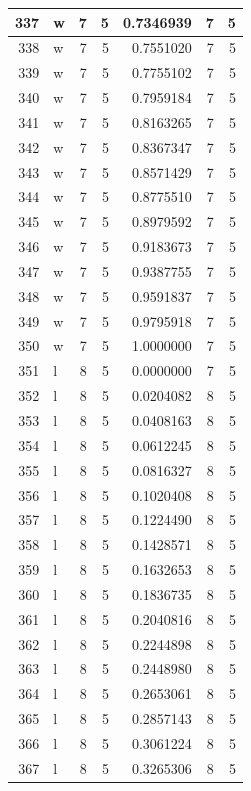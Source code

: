 \documentclass[
  letterpaper,
  DIV=11,
  numbers=noendperiod]{scrreprt}
\begin{document}
\begin{table}
\begin{tabular}[t]{r|l|r|r|r|r|r}
\hline
337 & w & 7 & 5 & 0.7346939 & 7 & 5\\
\hline
338 & w & 7 & 5 & 0.7551020 & 7 & 5\\
\hline
339 & w & 7 & 5 & 0.7755102 & 7 & 5\\
\hline
340 & w & 7 & 5 & 0.7959184 & 7 & 5\\
\hline
341 & w & 7 & 5 & 0.8163265 & 7 & 5\\
\hline
342 & w & 7 & 5 & 0.8367347 & 7 & 5\\
\hline
343 & w & 7 & 5 & 0.8571429 & 7 & 5\\
\hline
344 & w & 7 & 5 & 0.8775510 & 7 & 5\\
\hline
345 & w & 7 & 5 & 0.8979592 & 7 & 5\\
\hline
346 & w & 7 & 5 & 0.9183673 & 7 & 5\\
\hline
347 & w & 7 & 5 & 0.9387755 & 7 & 5\\
\hline
348 & w & 7 & 5 & 0.9591837 & 7 & 5\\
\hline
349 & w & 7 & 5 & 0.9795918 & 7 & 5\\
\hline
350 & w & 7 & 5 & 1.0000000 & 7 & 5\\
\hline
351 & l & 8 & 5 & 0.0000000 & 7 & 5\\
\hline
352 & l & 8 & 5 & 0.0204082 & 8 & 5\\
\hline
353 & l & 8 & 5 & 0.0408163 & 8 & 5\\
\hline
354 & l & 8 & 5 & 0.0612245 & 8 & 5\\
\hline
355 & l & 8 & 5 & 0.0816327 & 8 & 5\\
\hline
356 & l & 8 & 5 & 0.1020408 & 8 & 5\\
\hline
357 & l & 8 & 5 & 0.1224490 & 8 & 5\\
\hline
358 & l & 8 & 5 & 0.1428571 & 8 & 5\\
\hline
359 & l & 8 & 5 & 0.1632653 & 8 & 5\\
\hline
360 & l & 8 & 5 & 0.1836735 & 8 & 5\\
\hline
361 & l & 8 & 5 & 0.2040816 & 8 & 5\\
\hline
362 & l & 8 & 5 & 0.2244898 & 8 & 5\\
\hline
363 & l & 8 & 5 & 0.2448980 & 8 & 5\\
\hline
364 & l & 8 & 5 & 0.2653061 & 8 & 5\\
\hline
365 & l & 8 & 5 & 0.2857143 & 8 & 5\\
\hline
366 & l & 8 & 5 & 0.3061224 & 8 & 5\\
\hline
367 & l & 8 & 5 & 0.3265306 & 8 & 5\\

\end{tabular}
\end{table}
\end{document}
